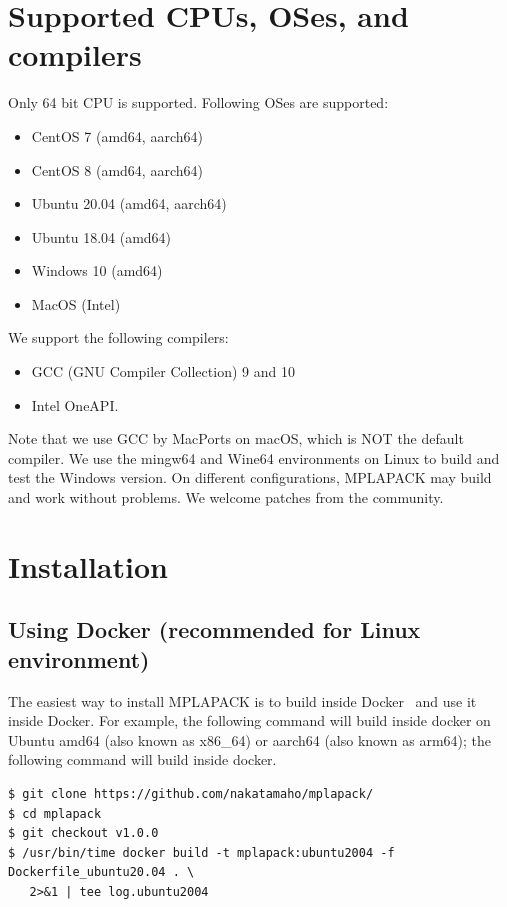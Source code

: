 \documentclass[12pt]{article}
\begin{document}
\section{Supported CPUs, OSes, and compilers}
\label{sec:supportedcpu}
Only 64 bit CPU is supported. Following OSes are supported:

\begin{itemize}
\item CentOS 7 (amd64, aarch64)
\item CentOS 8 (amd64, aarch64)
\item Ubuntu 20.04 (amd64, aarch64)
\item Ubuntu 18.04 (amd64)
\item Windows 10 (amd64)
\item MacOS (Intel)
\end{itemize}

We support the following compilers:
\begin{itemize}
\item GCC (GNU Compiler Collection) 9 and 10
\item Intel OneAPI.
\end{itemize}
Note that we use GCC by MacPorts on macOS, which is NOT the default compiler. We use the mingw64 and Wine64 environments on Linux to build and test the Windows version. On different configurations, MPLAPACK may build and work without problems. We welcome patches from the community.

\section{Installation}
\label{sec:howtoinstall}
\subsection{Using Docker (recommended for Linux environment)}
The easiest way to install MPLAPACK is to build inside Docker~\cite{merkel2014docker} and use it inside Docker. 
For example, the following command will build inside docker on Ubuntu amd64 (also known as x86\_64) or aarch64 (also known as arm64); the following command will build inside docker.

\begin{verbatim}
$ git clone https://github.com/nakatamaho/mplapack/
$ cd mplapack
$ git checkout v1.0.0
$ /usr/bin/time docker build -t mplapack:ubuntu2004 -f Dockerfile_ubuntu20.04 . \
   2>&1 | tee log.ubuntu2004
\end{verbatim}
\end{document}
